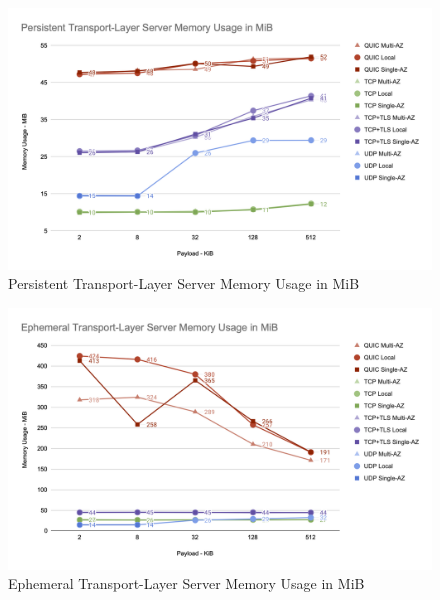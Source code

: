 \begin{figure}[h!]
    \centering
    \includegraphics[width=\linewidth]{figures/charts/Persistent Transport-Layer Server Memory Usage in MiB.png}
    \caption{Persistent Transport-Layer Server Memory Usage in MiB}
    \label{fig:persistent_server_transport_memory}
\end{figure}

\begin{figure}[h!]
    \centering
    \includegraphics[width=\linewidth]{figures/charts/Ephemeral Transport-Layer Server Memory Usage in MiB.png}
    \caption{Ephemeral Transport-Layer Server Memory Usage in MiB}
    \label{fig:ephemeral_server_transport_memory}
\end{figure}

\clearpage
